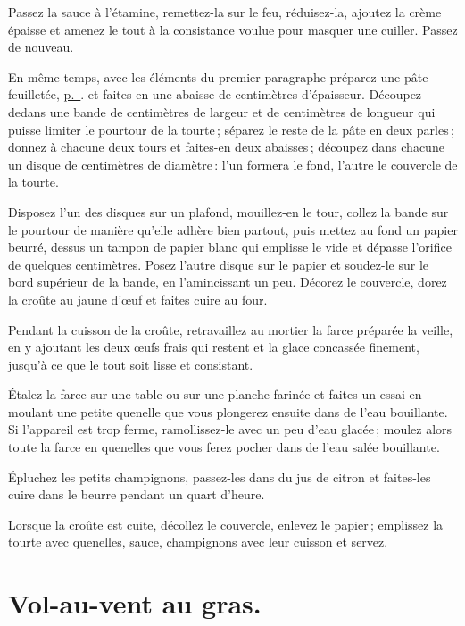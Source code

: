 Passez la sauce à l'étamine, remettez-la sur le feu, réduisez-la, ajoutez la
crème épaisse et amenez le tout à la consistance voulue pour masquer une
cuiller. Passez de nouveau.

En même temps, avec les éléments du premier paragraphe préparez une pâte
feuilletée, \hyperlink{p0319}{p. \pageref{pg0319}}. et faites-en une abaisse de
{\mmm} centimètres d'épaisseur. Découpez dedans une bande de {\mmm}
centimètres de largeur et de {\mmm} centimètres de longueur qui puisse
limiter le pourtour de la tourte ; séparez le reste de la pâte en deux parles ;
donnez à chacune deux tours et faites-en deux abaisses ; découpez dans chacune
un disque de {\mmm} centimètres de diamètre : l'un formera le fond,
l'autre le couvercle de la tourte.

Disposez l'un des disques sur un plafond, mouillez-en le tour, collez la bande
sur le pourtour de manière qu'elle adhère bien partout, puis mettez au fond un
papier beurré, dessus un tampon de papier blanc qui emplisse le vide et dépasse
l'orifice de quelques centimètres. Posez l'autre disque sur le papier et
soudez-le sur le bord supérieur de la bande, en l'amincissant un peu. Décorez
le couvercle, dorez la croûte au jaune d'œuf et faites cuire au four.

Pendant la cuisson de la croûte, retravaillez au mortier la farce préparée la
veille, en y ajoutant les deux œufs frais qui restent et la glace concassée
finement, jusqu'à ce que le tout soit lisse et consistant.

Étalez la farce sur une table ou sur une planche farinée et faites un essai en
moulant une petite quenelle que vous plongerez ensuite dans de l'eau
bouillante. Si l'appareil est trop ferme, ramollissez-le avec un peu d'eau
glacée ; moulez alors toute la farce en quenelles que vous ferez pocher dans de
l'eau salée bouillante.

Épluchez les petits champignons, passez-les dans du jus de citron et faites-les
cuire dans le beurre pendant un quart d'heure.

Lorsque la croûte est cuite, décollez le couvercle, enlevez le papier ;
emplissez la tourte avec quenelles, sauce, champignons avec leur cuisson et
servez.

\section*{\centering Vol-au-vent au gras.}
{}

